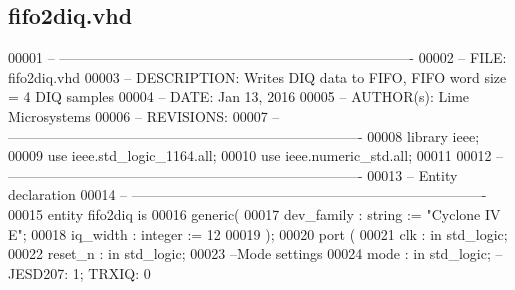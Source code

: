 \subsection{fifo2diq.\+vhd}
\label{fifo2diq_8vhd_source}

\begin{DoxyCode}
00001 \textcolor{keyword}{-- ---------------------------------------------------------------------------- }
00002 \textcolor{keyword}{-- FILE:    fifo2diq.vhd}
00003 \textcolor{keyword}{-- DESCRIPTION: Writes DIQ data to FIFO, FIFO word size = 4  DIQ samples }
00004 \textcolor{keyword}{-- DATE:    Jan 13, 2016}
00005 \textcolor{keyword}{-- AUTHOR(s):   Lime Microsystems}
00006 \textcolor{keyword}{-- REVISIONS:}
00007 \textcolor{keyword}{-- ---------------------------------------------------------------------------- }
00008 \textcolor{vhdlkeyword}{library }\textcolor{keywordflow}{ieee};
00009 \textcolor{vhdlkeyword}{use }ieee.std\_logic\_1164.\textcolor{keywordflow}{all};
00010 \textcolor{vhdlkeyword}{use }ieee.numeric\_std.\textcolor{keywordflow}{all};
00011 
00012 \textcolor{keyword}{-- ----------------------------------------------------------------------------}
00013 \textcolor{keyword}{-- Entity declaration}
00014 \textcolor{keyword}{-- ----------------------------------------------------------------------------}
00015 \textcolor{keywordflow}{entity }fifo2diq \textcolor{keywordflow}{is}
00016    \textcolor{keywordflow}{generic}\textcolor{vhdlchar}{(} 
00017       \textcolor{vhdlchar}{dev_family}           \textcolor{vhdlchar}{:} \textcolor{comment}{string} \textcolor{vhdlchar}{:=} \textcolor{keyword}{"Cyclone IV E"};
00018       \textcolor{vhdlchar}{iq_width}             \textcolor{vhdlchar}{:} \textcolor{comment}{integer} \textcolor{vhdlchar}{:=} \textcolor{vhdllogic}{}\textcolor{vhdllogic}{12}
00019       \textcolor{vhdlchar}{)};
00020    \textcolor{keywordflow}{port} \textcolor{vhdlchar}{(}
00021       \textcolor{vhdlchar}{clk}                  \textcolor{vhdlchar}{:} \textcolor{keywordflow}{in} \textcolor{comment}{std\_logic};
00022       \textcolor{vhdlchar}{reset_n}              \textcolor{vhdlchar}{:} \textcolor{keywordflow}{in} \textcolor{comment}{std\_logic};
00023 \textcolor{keyword}{      --Mode settings}
00024       \textcolor{vhdlchar}{mode}                 \textcolor{vhdlchar}{:} \textcolor{keywordflow}{in} \textcolor{comment}{std\_logic};\textcolor{keyword}{ -- JESD207: 1; TRXIQ: 0}

\end{DoxyCode}
